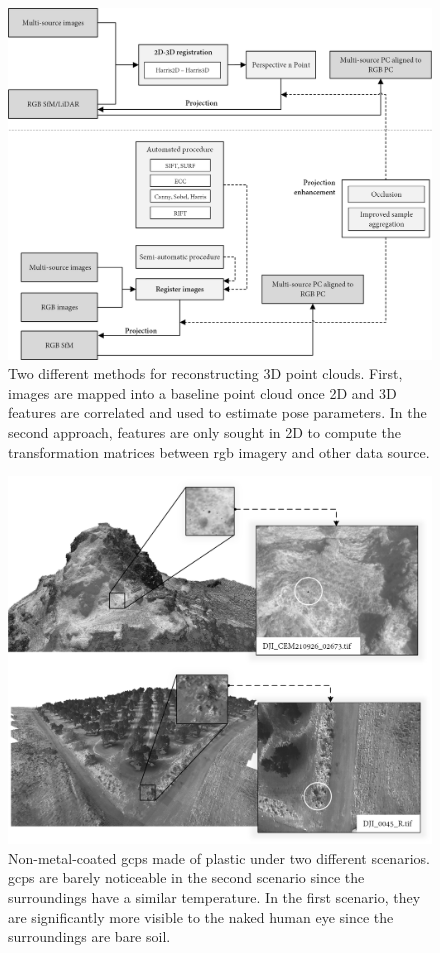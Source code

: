 \begin{figure}[ht]
	\includegraphics[width=\linewidth]{figs/context/fusion_03.png}
	\caption{Two different methods for reconstructing 3D point clouds. First, images are mapped into a baseline point cloud once 2D and 3D features are correlated and used to estimate pose parameters. In the second approach, features are only sought in 2D to compute the transformation matrices between \acrshort{rgb} imagery and other data source. }
    \label{fig:fusion_data_03}
\end{figure}

\begin{figure}[ht]
	\includegraphics[width=\textwidth]{figs/context/gcps.png}
	\caption{Non-metal-coated \acrshort{gcp}s made of plastic under two different scenarios. \acrshort{gcp}s are barely noticeable in the second scenario since the surroundings have a similar temperature. In the first scenario, they are significantly more visible to the naked human eye since the surroundings are bare soil. }
    \label{fig:gcps_thermography}
\end{figure}

